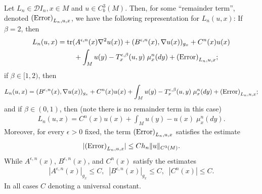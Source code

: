 \documentclass[11pt,reqno]{amsart}
\numberwithin{equation}{section}
\theoremstyle{plain}
\def\D{\mathcal D}
\def\Tr{\textnormal{tr}}
\begin{document}
\begin{lem}\label{lem:DiscreteMeasuresDInLocalAndNonlocalParts}

  Let $L_n\in\D I_n, x\in M$ and $u\in C^3_b(M)$. Then, for some ``remainder term'', denoted $\textnormal{(Error)}_{L_n,u,x}$, we have the following representation for $L_n(u,x)$: If $\beta=2$, then 
  \begin{align*}
    L_n(u,x) & = \Tr(A^{\epsilon,n}(x)\nabla ^2u(x))+(B^{\epsilon,n}(x),\nabla  u(x))_{g_x}+C^{n}(x)u(x)\\
    &\ \ \ \ \ \ \  +\int_{M}u(y)-T^{\epsilon,\beta}_x(u,y)\;\mu_x^{n}(dy)+\textnormal{(Error)}_{L_n,u,x};
  \end{align*}
  if $\beta\in [1,2)$, then
  \begin{align*}
    L_n(u,x) = (B^{\epsilon,n}(x),\nabla u(x))_{g_x}+C^{n}(x)u(x)
      +\int_{M}u(y)-T^{\epsilon,\beta}_x(u,y)\;\mu_x^{n}(dy)+\textnormal{(Error)}_{L_n,u,x};
  \end{align*}
  and if $\beta\in (0,1)$, then (note there is no remainder term in this case)
  \begin{align*}
    L_n(u,x)= C^{n}(x)u(x) + \int_{M}u(y)-u(x)\;\mu_x^{n}(dy).
  \end{align*}
  Moreover, for every $\epsilon>0$ fixed, the term $\textnormal{(Error)}_{L_n,u,x}$ satisfies the estimate
  \begin{align*}
    |\textnormal{(Error)}_{L_n,u,x}| \leq Ch_n\|u\|_{C^3(M)}.  	  
  \end{align*}	         
  While $A^{\epsilon,n}(x)$, $B^{\epsilon,n}(x)$, and $C^{n}(x)$ satisfy the estimates
  \begin{align*}
    |A^{\epsilon,n}(x)|_{g_x} \leq C,\;\;|B^{\epsilon,n}(x)|_{g_x} \leq C,\;\;|C^{n}(x)|\leq C. 
  \end{align*}	  
  In all cases $C$ denoting a universal constant.
\end{lem}
\end{document}
